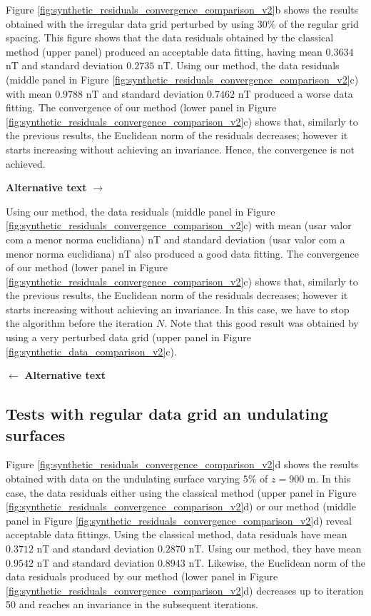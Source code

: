 Figure \ref{fig:synthetic_residuals_convergence_comparison_v2}b shows the results obtained
with the irregular data grid perturbed by using $30\%$ of the regular grid spacing.
This figure shows that the data residuals 
obtained by the classical method (upper panel) produced an acceptable data fitting, having mean 
$0.3634$ nT and standard deviation $0.2735$ nT. 
Using our method, the data residuals (middle panel in Figure 
\ref{fig:synthetic_residuals_convergence_comparison_v2}c) with mean $0.9788$ nT and 
standard deviation $0.7462$ nT produced a worse data fitting.
The convergence of our method (lower panel in Figure 
\ref{fig:synthetic_residuals_convergence_comparison_v2}c) shows that, 
similarly to the previous results, the Euclidean norm of the residuals decreases; however it starts
increasing without achieving an invariance. Hence, the convergence is not achieved. 

\textbf{Alternative text} $\rightarrow$

Using our method, the data residuals (middle panel in Figure 
\ref{fig:synthetic_residuals_convergence_comparison_v2}c) with mean (usar valor com a menor norma euclidiana) nT and 
standard deviation (usar valor com a menor norma euclidiana) nT also produced a good data fitting.
The convergence of our method (lower panel in Figure 
\ref{fig:synthetic_residuals_convergence_comparison_v2}c) shows that, 
similarly to the previous results, the Euclidean norm of the residuals decreases; however it starts
increasing without achieving an invariance. In this case, we have to stop the algorithm
before the iteration $N$. Note that this good result was obtained by using a very perturbed
data grid (upper panel in Figure \ref{fig:synthetic_data_comparison_v2}c).

$\leftarrow$ \textbf{Alternative text}

\subsection*{Tests with regular data grid an undulating surfaces}

Figure \ref{fig:synthetic_residuals_convergence_comparison_v2}d shows the results obtained
with data on the undulating surface varying $5\%$ of $z = 900$ m.
In this case, the data residuals either using the classical method 
(upper panel in Figure \ref{fig:synthetic_residuals_convergence_comparison_v2}d) or
our method (middle panel in Figure \ref{fig:synthetic_residuals_convergence_comparison_v2}d) reveal
acceptable data fittings.
Using the classical method, data residuals have mean $0.3712$ nT and standard deviation $0.2870$ nT.
Using our method, they have mean $0.9542$ nT and standard deviation $0.8943$ nT. 
Likewise, the Euclidean norm of the data residuals produced by our method 
(lower panel in Figure \ref{fig:synthetic_residuals_convergence_comparison_v2}d) decreases up to 
iteration 50 and reaches an invariance in the subsequent iterations.

